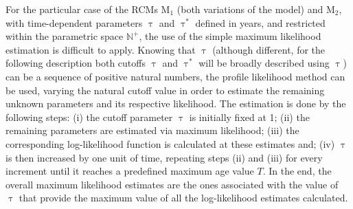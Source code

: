 For the particular case of the RCMs M$_1$ (both variations of the model) and M$_2$, with time-dependent parameters $\uptau$ and $\uptau^*$ defined in years, and restricted within the parametric space $\mathbb{N}^{+}$, the use of the simple maximum likelihood estimation is difficult to apply.
Knowing that $\uptau$ (although different, for the following description both cutoffs $\uptau$ and $\uptau^*$ will be broadly described using $\uptau$) can be a sequence of positive natural numbers, the profile likelihood method can be used, varying the natural cutoff value in order to estimate the remaining unknown parameters and its respective likelihood.
The estimation is done by the following steps:
(i) the cutoff parameter $\uptau$ is initially fixed at 1;
(ii) the remaining parameters are estimated via maximum likelihood;
(iii) the corresponding log-likelihood function is calculated at these estimates and;
(iv) $\uptau$ is then increased by one unit of time, repeating steps (ii) and (iii) for every increment until it reaches a predefined maximum age value $T$.
In the end, the overall maximum likelihood estimates are the ones associated with the value of $\uptau$ that provide the maximum value of all the log-likelihood estimates calculated.

